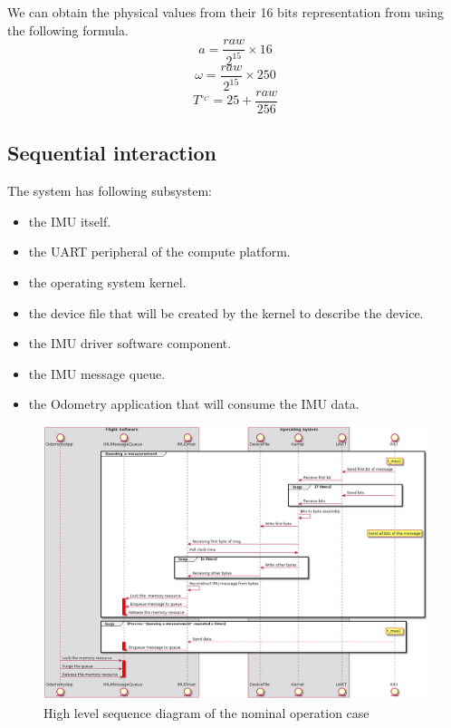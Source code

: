 We can obtain the physical values from their 16 bits representation from using the following formula.
\begin{equation}
    a = \frac{raw}{2^{15}} \times 16
\end{equation}
\begin{equation}
    \omega = \frac{raw}{2^{15}} \times 250
\end{equation}
\begin{equation}
    T^{\circ_C} = 25+\frac{raw}{256}
\end{equation}



\subsection{Sequential interaction}
The system has following subsystem:
\begin{itemize}
    \item the IMU itself.
    \item the UART peripheral of the compute platform.
    \item the operating system kernel.
    \item the device file that will be created by the kernel to describe the device.
    \item the IMU driver software component.
    \item the IMU message queue.
    \item the Odometry application that will consume the IMU data.
\end{itemize}

\begin{figure}[H]
    \centering
    \includegraphics[width=1.0 \textwidth]{diagrams/high_level_sys_overview.png}
    \caption{High level sequence diagram of the nominal operation case}
    \label{fig-high-level-nominal}
\end{figure}

